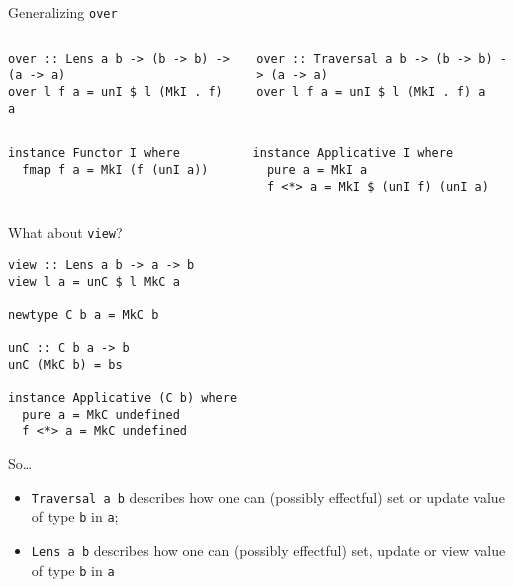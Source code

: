 \documentclass[presentation,aspectratio=169,8pt]{beamer}
\begin{document}
\begin{frame}[label={sec:orgc5a7786},fragile]{Generalizing \texttt{over}}
 \begin{columns}
\begin{column}{0.5\columnwidth}
\begin{verbatim}
over :: Lens a b -> (b -> b) -> (a -> a)
over l f a = unI $ l (MkI . f) a
\end{verbatim}
\end{column}

\begin{column}{0.5\columnwidth}
\begin{verbatim}
over :: Traversal a b -> (b -> b) -> (a -> a)
over l f a = unI $ l (MkI . f) a
\end{verbatim}
\end{column}
\end{columns}

\begin{columns}
\pause

\begin{column}{0.5\columnwidth}
\begin{verbatim}
instance Functor I where
  fmap f a = MkI (f (unI a))
\end{verbatim}
\end{column}

\begin{column}{0.5\columnwidth}
\begin{verbatim}
instance Applicative I where
  pure a = MkI a
  f <*> a = MkI $ (unI f) (unI a)
\end{verbatim}
\end{column}
\end{columns}
\end{frame}

\begin{frame}[label={sec:orgefcac02},fragile]{What about \texttt{view}?}
 \begin{verbatim}
view :: Lens a b -> a -> b
view l a = unC $ l MkC a

newtype C b a = MkC b

unC :: C b a -> b
unC (MkC b) = bs

instance Applicative (C b) where
  pure a = MkC undefined
  f <*> a = MkC undefined
\end{verbatim}
\end{frame}

\begin{frame}[label={sec:orgbf40d5f},fragile]{So\ldots{}}
 \begin{itemize}
\item \texttt{Traversal a b} describes how one can (possibly effectful) set or update value
of type \texttt{b} in \texttt{a};
\item \texttt{Lens a b} describes how one can (possibly effectful) set, update or \alert{view}
value of type \texttt{b} in \texttt{a}
\end{itemize}
\end{frame}
\end{document}
